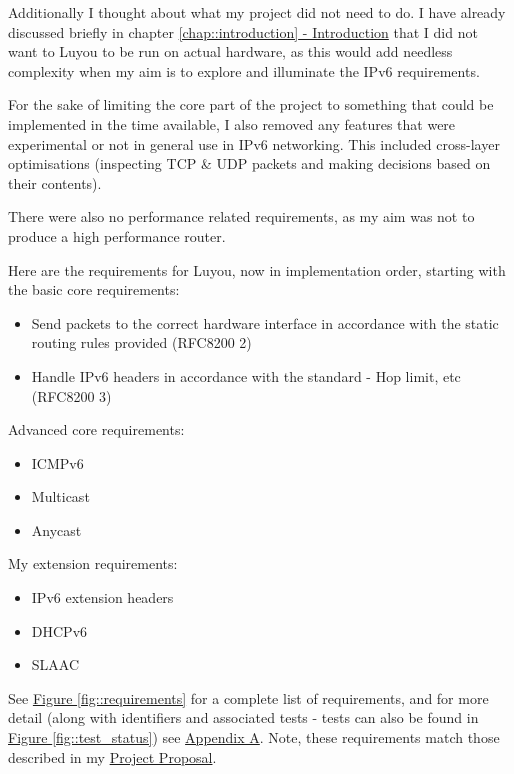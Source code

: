 \documentclass[12pt,a4paper,twoside,openany]{report}
\begin{document}
\bigskip

Additionally I thought about what my project did not need to do. I have already discussed briefly in chapter \ref{chap::introduction}\hyperref[chap::introduction]{ - Introduction} that I did not want to Luyou to be run on actual hardware, as this would add needless complexity when my aim is to explore and illuminate the IPv6 requirements. 

For the sake of limiting the core part of the project to something that could be implemented in the time available, I also removed any features that were experimental or not in general use in IPv6 networking.  This included cross-layer optimisations (inspecting TCP \& UDP packets and making decisions based on their contents).

There were also no performance related requirements, as my aim was not to produce a high performance router.

\bigskip

Here are the requirements for Luyou, now in implementation order, starting with the basic core requirements:
\begin{itemize}
\item Send packets to the correct hardware interface in accordance with the static routing rules provided (RFC8200 2\cite{ipv6_rfc})
\item Handle IPv6 headers in accordance with the standard - Hop limit, etc (RFC8200 3\cite{ipv6_rfc})
\end{itemize}
Advanced core requirements:
\begin{itemize}
\item ICMPv6\cite{icmpv6_rfc}
\item Multicast\cite{ipv6_rfc_adr}
\item Anycast\cite{ipv6_rfc_adr}
\end{itemize}
My extension requirements:
\begin{itemize}
\item IPv6 extension headers\cite{ipv6_rfc}
\item DHCPv6\cite{dhcpv6_rfc}
\item SLAAC\cite{slaac_rfc}
\end{itemize}
See \hyperref[fig::requirements]{Figure }\ref{fig::requirements} for a complete list of requirements, and for more detail (along with identifiers and associated tests - tests can also be found in \hyperref[fig::test_status]{Figure }\ref{fig::test_status}) see \hyperref[appendix::requirements]{Appendix A}. Note, these requirements match those described in my  \hyperref[appendix::proposal]{Project Proposal}.
\end{document}
